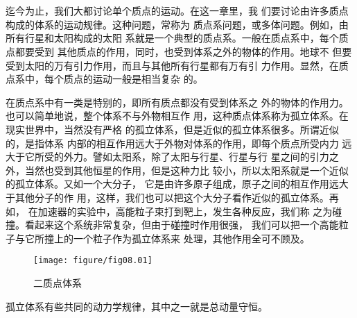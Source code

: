 \documentclass[../outline-of-mechanics.tex]{subfiles}
\begin{document}
\section[动量守恒]{}\label{sec:08.01}

迄今为止，我们大都讨论单个质点的运动。在这一章里，我
们要讨论由许多质点构成的体系的运动规律。这种问题，常称为
质点系问题，或多体问题。例如，由所有行星和太阳构成的太阳
系就是一个典型的质点系。一般在质点系中，每个质点都要受到
其他质点的作用，同时，也受到体系之外的物体的作用。地球不
但要受到太阳的万有引力作用，而且与其他所有行星都有万有引
力作用。显然，在质点系中，每个质点的运动一般是相当复杂
的。

在质点系中有一类是特别的，即所有质点都没有受到体系之
外的物体的作用力。也可以简单地说，整个体系不与外物相互作
用，这种质点体系称为孤立体系。在现实世界中，当然没有严格
的孤立体系，但是近似的孤立体系很多。所谓近似的，是指体系
内部的相互作用远大于外物对体系的作用，即每个质点所受内力
远大于它所受的外力。譬如太阳系，除了太阳与行星、行星与行
星之间的引力之外，当然也受到其他恒星的作用，但是这种力比
较小，所以太阳系就是一个近似的孤立体系。又如一个大分子，
它是由许多原子组成，原子之间的相互作用远大于其他分子的作
用，这样，我们也可以把这个大分子看作近似的孤立体系。再如，
在加速器的实验中，高能粒子束打到靶上，发生各种反应，我们称
\clearpage\noindent
之为碰撞。看起来这个系统非常复杂，但由于碰撞时作用很强，
我们可以把一个高能粒子与它所撞上的一个粒子作为孤立体系来
处理，其他作用全可不顾及。

\begin{wrapfigure}[5]{r}{13em}
  \vspace{-1.5em}
  \centering
  \texttt{[image: figure/fig08.01]}
  \caption{二质点体系}
  \label{fig:08.01}
\end{wrapfigure}
孤立体系有些共同的动力学规律，其中之一就是总动量守恒。
\end{document}
